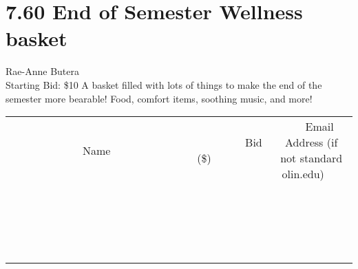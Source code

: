 \documentclass[11pt]{article}
\begin{document}
\section*{7.60 End of Semester Wellness basket}
Rae-Anne Butera
\\
Starting Bid: \$10
\newline
A basket filled with lots of things to make the end of the semester more bearable! Food, comfort items, soothing music, and more!
\\[3ex]
\begin{tabular}{c c c}
~~~~~~~~~~~~~Name~~~~~~~~~~~~~ & ~~~~~~~~~Bid (\$)~~~~~~~~~  & ~~~Email Address (if not standard olin.edu)~~~\\
 & & \\
\hline
 & & \\
\hline
 & & \\
\hline
 & & \\
\hline
 & & \\
\hline
 & & \\
\hline
 & & \\
\hline
 & & \\
\hline
 & & \\
\hline
 & & \\
\hline
 & & \\
\hline
 & & \\
\hline
 & & \\
\hline
 & & \\
\hline
 & & \\
\hline
 & & \\
\hline
 & & \\
\hline
 & & \\
\hline
 & & \\
\hline
\end{tabular}
\newpage
\end{document}
